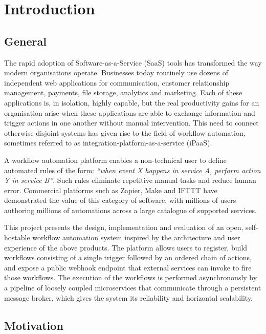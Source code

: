 \chapter{Introduction}

\section{General}

The rapid adoption of Software-as-a-Service (SaaS) tools has transformed the way modern organisations operate. Businesses today routinely use dozens of independent web applications for communication, customer relationship management, payments, file storage, analytics and marketing. Each of these applications is, in isolation, highly capable, but the real productivity gains for an organisation arise when these applications are able to exchange information and trigger actions in one another without manual intervention. This need to connect otherwise disjoint systems has given rise to the field of workflow automation, sometimes referred to as integration-platform-as-a-service (iPaaS).

A workflow automation platform enables a non-technical user to define automated rules of the form: \emph{``when event X happens in service A, perform action Y in service B''}. Such rules eliminate repetitive manual tasks and reduce human error. Commercial platforms such as Zapier, Make and IFTTT have demonstrated the value of this category of software, with millions of users authoring millions of automations across a large catalogue of supported services.

This project presents the design, implementation and evaluation of an open, self-hostable workflow automation system inspired by the architecture and user experience of the above products. The platform allows users to register, build workflows consisting of a single trigger followed by an ordered chain of actions, and expose a public webhook endpoint that external services can invoke to fire those workflows. The execution of the workflows is performed asynchronously by a pipeline of loosely coupled microservices that communicate through a persistent message broker, which gives the system its reliability and horizontal scalability.

\section{Motivation}

